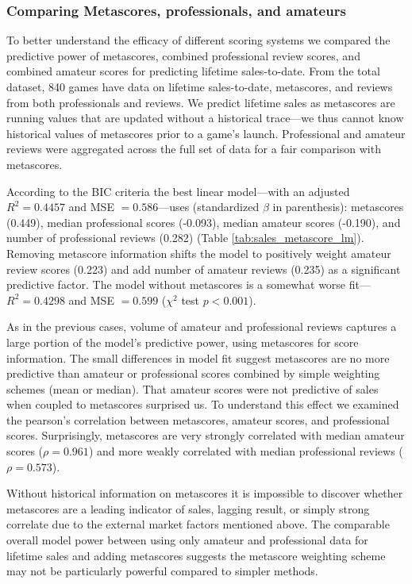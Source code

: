 \documentclass[letterpaper]{article}
\begin{document}
\subsubsection{Comparing Metascores, professionals, and amateurs}
To better understand the efficacy of different scoring systems we compared the predictive power of metascores, combined professional review scores, and combined amateur scores for predicting lifetime sales-to-date. From the total dataset, 840 games have data on lifetime sales-to-date, metascores, and reviews from both professionals and reviews. We predict lifetime sales as metascores are running values that are updated without a historical trace---we thus cannot know historical values of metascores prior to a game's launch. Professional and amateur reviews were aggregated across the full set of data for a fair comparison with metascores.

According to the BIC criteria the best linear model---with an adjusted $R^2 = 0.4457$ and MSE $= 0.586$---uses (standardized $\beta$ in parenthesis): metascores (0.449), median professional scores (-0.093), median amateur scores (-0.190), and number of professional reviews (0.282) (Table \ref{tab:sales_metascore_lm}). Removing metascore information shifts the model to positively weight amateur review scores (0.223) and add number of amateur reviews (0.235) as a significant predictive factor. The model without metascores is a somewhat worse fit---$R^2 = 0.4298$ and MSE $= 0.599$ ($\chi^2$ test $p < 0.001$).

As in the previous cases, volume of amateur and professional reviews captures a large portion of the model's predictive power, using metascores for score information. The small differences in model fit suggest metascores are no more predictive than amateur or professional scores combined by simple weighting schemes (mean or median). That amateur scores were not predictive of sales when coupled to metascores surprised us. To understand this effect we examined the pearson's correlation between metascores, amateur scores, and professional scores. Surprisingly, metascores are very strongly correlated with median amateur scores ($\rho = 0.961$) and more weakly correlated with median professional reviews ($\rho = 0.573$). 

Without historical information on metascores it is impossible to discover whether metascores are a leading indicator of sales, lagging result, or simply strong correlate due to the external market factors mentioned above. The comparable overall model power between using only amateur and professional data for lifetime sales and adding metascores suggests the metascore weighting scheme may not be particularly powerful compared to simpler methods.
\end{document}
